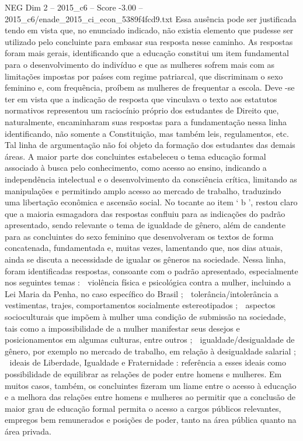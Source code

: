 \begin{textsample}{NEG Dim 2 – 2015\_c6 – Score -3.00 – 2015\_c6/enade\_2015\_ci\_econ\_5389f4fcd9.txt}
Essa ausência pode ser justificada tendo em vista que, no enunciado indicado, não existia elemento que pudesse ser utilizado pelo concluinte para embasar sua resposta nesse caminho.
As respostas foram mais gerais, identificando que a educação constitui um item fundamental para o desenvolvimento do indivíduo e que as mulheres sofrem mais com as limitações impostas por países com regime patriarcal, que discriminam o sexo feminino e, com frequência, proíbem as mulheres de frequentar a escola.
Deve -se ter em vista que a indicação de resposta que vinculava o texto aos estatutos normativos representou um raciocínio próprio dos estudantes de Direito que, naturalmente, encaminharam suas respostas para a fundamentação nessa linha identificando, não somente a Constituição, mas também leis, regulamentos, etc.
Tal linha de argumentação não foi objeto da formação dos estudantes das demais áreas.
A maior parte dos concluintes estabeleceu o tema educação formal associado à busca pelo conhecimento, como acesso ao ensino, indicando a independência intelectual e o desenvolvimento da consciência crítica, limitando as manipulações e permitindo amplo acesso ao mercado de trabalho, traduzindo uma libertação econômica e ascensão social.
No tocante ao item ‘ b ’, restou claro que a maioria esmagadora das respostas confluiu para as indicações do padrão apresentado, sendo relevante o tema de igualdade de gênero, além de candente para as concluintes do sexo feminino que desenvolveram os textos de forma concatenada, fundamentada e, muitas vezes, lamentando que, nos dias atuais, ainda se discuta a necessidade de igualar os gêneros na sociedade.
Nessa linha, foram identificadas respostas, consoante com o padrão apresentado, especialmente nos seguintes temas :  violência física e psicológica contra a mulher, incluindo a Lei Maria da Penha, no caso específico do Brasil ;  tolerância/intolerância a vestimentas, trajes, comportamentos socialmente estereotipados ;  aspectos socioculturais que impõem à mulher uma condição de submissão na sociedade, tais como a impossibilidade de a mulher manifestar seus desejos e posicionamentos em algumas culturas, entre outros ;  igualdade/desigualdade de gênero, por exemplo no mercado de trabalho, em relação à desigualdade salarial ;  ideais de Liberdade, Igualdade e Fraternidade : referência a esses ideais como possibilidade de equilibrar as relações de poder entre homens e mulheres.
Em muitos casos, também, os concluintes fizeram um liame entre o acesso à educação e a melhora das relações entre homens e mulheres ao permitir que a conclusão de maior grau de educação formal permita o acesso a cargos públicos relevantes, empregos bem remunerados e posições de poder, tanto na área pública quanto na área privada.

\end{textsample}
